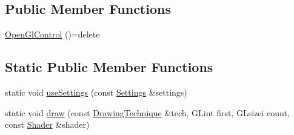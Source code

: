 \subsection*{Public Member Functions}
\begin{DoxyCompactItemize}
\item 
\hyperlink{classburn_1_1_open_gl_control_af0292f07d081ec7a448356800d93b4b5}{Open\-Gl\-Control} ()=delete
\end{DoxyCompactItemize}
\subsection*{Static Public Member Functions}
\begin{DoxyCompactItemize}
\item 
static void \hyperlink{classburn_1_1_open_gl_control_a7e3ac3b3c47f5b227d395ff058eece87}{use\-Settings} (const \hyperlink{classburn_1_1_open_gl_control_1_1_settings}{Settings} \&settings)
\item 
static void \hyperlink{classburn_1_1_open_gl_control_a4b3f92e496d1b6e1dacac6d962573e5f}{draw} (const \hyperlink{classburn_1_1_open_gl_control_ac00eaabafad02504f23f8e2cfae92727}{Drawing\-Technique} \&tech, G\-Lint first, G\-Lsizei count, const \hyperlink{classburn_1_1_shader}{Shader} \&shader)
\end{DoxyCompactItemize}


